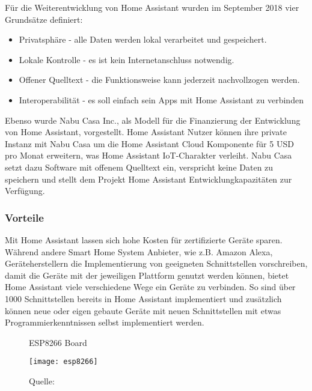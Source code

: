 Für die Weiterentwicklung von Home Assistant wurden im September 2018 vier Grundsätze definiert:

\begin{itemize}
	\item Privatsphäre - alle Daten werden lokal verarbeitet und gespeichert.
	\item Lokale Kontrolle - es ist kein Internetanschluss notwendig.
	\item Offener Quelltext - die Funktionsweise kann jederzeit nachvollzogen werden.
	\item Interoperabilität - es soll einfach sein Apps mit Home Assistant zu verbinden
\end{itemize}

Ebenso wurde Nabu Casa Inc., als Modell für die Finanzierung der Entwicklung von Home Assistant, vorgestellt.
Home Assistant Nutzer können ihre private Instanz mit Nabu Casa um die Home Assistant Cloud Komponente für 5 USD pro Monat erweitern, was Home Assistant \ac{IoT}-Charakter verleiht.
Nabu Casa setzt dazu Software mit offenem Quelltext ein, verspricht keine Daten zu speichern und stellt dem Projekt Home Assistant Entwicklungkapazitäten zur Verfügung.

\subsubsection{Vorteile}

Mit Home Assistant lassen sich hohe Kosten für zertifizierte Geräte sparen.
Während andere Smart Home System Anbieter, wie z.B. Amazon Alexa, Geräteherstellern die Implementierung von geeigneten Schnittstellen vorschreiben, damit die Geräte mit der jeweiligen Plattform genutzt werden können, bietet Home Assistant viele verschiedene Wege ein Geräte zu verbinden.
So sind über 1000 Schnittstellen bereits in Home Assistant implementiert und zusätzlich können neue oder eigen gebaute Geräte mit neuen Schnittstellen mit etwas Programmierkenntnissen selbst implementiert werden.

\begin{wrapfigure}{r}{0.4\textwidth}
	\centering
	\caption{ESP8266 Board}
	\texttt{[image: esp8266]}
	\caption*{\footnotesize{Quelle: }}
	\label{fig:esp8266}
\end{wrapfigure}

